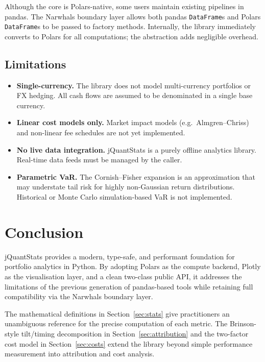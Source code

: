 \documentclass[11pt,a4paper]{article}
\begin{document}
Although the core is Polars-native, some users maintain existing pipelines in
pandas.  The Narwhals boundary layer allows both pandas \texttt{DataFrame}s
and Polars \texttt{DataFrame}s to be passed to factory methods.  Internally,
the library immediately converts to Polars for all computations; the
abstraction adds negligible overhead.

\subsection{Limitations}

\begin{itemize}
  \item \textbf{Single-currency.}  The library does not model multi-currency
    portfolios or FX hedging.  All cash flows are assumed to be denominated
    in a single base currency.
  \item \textbf{Linear cost models only.}  Market impact models (e.g.\
    Almgren–Chriss) and non-linear fee schedules are not yet implemented.
  \item \textbf{No live data integration.}  jQuantStats is a purely offline
    analytics library.  Real-time data feeds must be managed by the caller.
  \item \textbf{Parametric VaR.}  The Cornish–Fisher expansion is an
    approximation that may understate tail risk for highly non-Gaussian
    return distributions.  Historical or Monte Carlo simulation-based VaR
    is not implemented.
\end{itemize}

\section{Conclusion}
\label{sec:conclusion}

jQuantStats provides a modern, type-safe, and performant foundation for
portfolio analytics in Python.  By adopting Polars as the compute backend,
Plotly as the visualisation layer, and a clean two-class public API, it
addresses the limitations of the previous generation of pandas-based tools
while retaining full compatibility via the Narwhals boundary layer.

The mathematical definitions in Section~\ref{sec:stats} give practitioners
an unambiguous reference for the precise computation of each metric.  The
Brinson-style tilt/timing decomposition in Section~\ref{sec:attribution} and
the two-factor cost model in Section~\ref{sec:costs} extend the library beyond
simple performance measurement into attribution and cost analysis.
\end{document}
